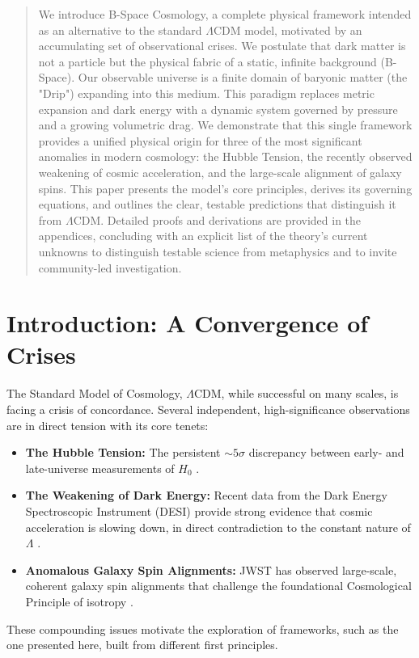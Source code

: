 \documentclass{BSpacePaper} %
\begin{document}
\makeBSCSsupplementtitle
\tableofcontents
\clearpage

\begin{abstract}
\noindent
We introduce B-Space Cosmology, a complete physical framework intended as an alternative to the standard \(\Lambda\)CDM model, motivated by an accumulating set of observational crises. We postulate that dark matter is not a particle but the physical fabric of a static, infinite background (B-Space). Our observable universe is a finite domain of baryonic matter (the "Drip") expanding into this medium. This paradigm replaces metric expansion and dark energy with a dynamic system governed by pressure and a growing volumetric drag. We demonstrate that this single framework provides a unified physical origin for three of the most significant anomalies in modern cosmology: the Hubble Tension, the recently observed weakening of cosmic acceleration, and the large-scale alignment of galaxy spins. This paper presents the model's core principles, derives its governing equations, and outlines the clear, testable predictions that distinguish it from \(\Lambda\)CDM. Detailed proofs and derivations are provided in the appendices, concluding with an explicit list of the theory's current unknowns to distinguish testable science from metaphysics and to invite community-led investigation.
\end{abstract}

\section{Introduction: A Convergence of Crises}
The Standard Model of Cosmology, \(\Lambda\)CDM, while successful on many scales, is facing a crisis of concordance. Several independent, high-significance observations are in direct tension with its core tenets:
\begin{itemize}
    \item \textbf{The Hubble Tension:} The persistent $\sim 5\sigma$ discrepancy between early- and late-universe measurements of $H_0$ \citep{Planck2020, Riess2022, Verde2019}.
    \item \textbf{The Weakening of Dark Energy:} Recent data from the Dark Energy Spectroscopic Instrument (DESI) provide strong evidence that cosmic acceleration is slowing down, in direct contradiction to the constant nature of \(\Lambda\) \citep{DESI2025}.    
    \item \textbf{Anomalous Galaxy Spin Alignments:} JWST has observed large-scale, coherent galaxy spin alignments that challenge the foundational Cosmological Principle of isotropy \citep{Lee2023}.
\end{itemize}
These compounding issues motivate the exploration of frameworks, such as the one presented here, built from different first principles.
\end{document}
